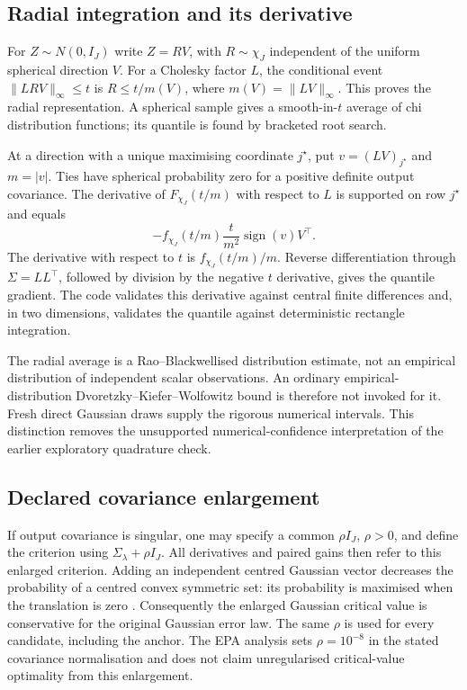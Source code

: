 \subsection{Radial integration and its derivative}
For $Z\sim N(0,I_J)$ write $Z=RV$, with $R\sim\chi_J$ independent of the uniform spherical direction $V$. For a Cholesky factor $L$, the conditional event $\|LRV\|_\infty\leq t$ is $R\leq t/m(V)$, where $m(V)=\|LV\|_\infty$. This proves the radial representation. A spherical sample gives a smooth-in-$t$ average of chi distribution functions; its quantile is found by bracketed root search.

At a direction with a unique maximising coordinate $j^\star$, put $v=(LV)_{j^\star}$ and $m=|v|$. Ties have spherical probability zero for a positive definite output covariance. The derivative of $F_{\chi_J}(t/m)$ with respect to $L$ is supported on row $j^\star$ and equals
\[
 -f_{\chi_J}(t/m)\frac{t}{m^2}\operatorname{sign}(v)V^\top.
\]
The derivative with respect to $t$ is $f_{\chi_J}(t/m)/m$. Reverse differentiation through $\Sigma=LL^\top$, followed by division by the negative $t$ derivative, gives the quantile gradient. The code validates this derivative against central finite differences and, in two dimensions, validates the quantile against deterministic rectangle integration.

The radial average is a Rao--Blackwellised distribution estimate, not an empirical distribution of independent scalar observations. An ordinary empirical-distribution Dvoretzky--Kiefer--Wolfowitz bound is therefore not invoked for it. Fresh direct Gaussian draws supply the rigorous numerical intervals. This distinction removes the unsupported numerical-confidence interpretation of the earlier exploratory quadrature check.

\subsection{Declared covariance enlargement}
If output covariance is singular, one may specify a common $\rho I_J$, $\rho>0$, and define the criterion using $\Sigma_\lambda+\rho I_J$. All derivatives and paired gains then refer to this enlarged criterion. Adding an independent centred Gaussian vector decreases the probability of a centred convex symmetric set: its probability is maximised when the translation is zero \citep{Anderson1955}. Consequently the enlarged Gaussian critical value is conservative for the original Gaussian error law. The same $\rho$ is used for every candidate, including the anchor. The EPA analysis sets $\rho=10^{-8}$ in the stated covariance normalisation and does not claim unregularised critical-value optimality from this enlargement.
